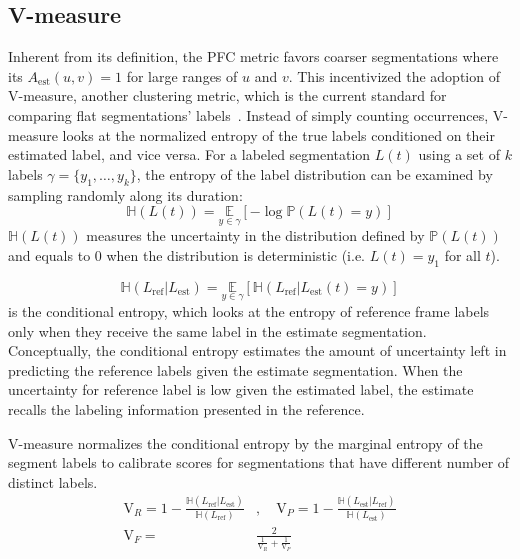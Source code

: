 \subsection{V-measure}
Inherent from its definition, the PFC metric favors coarser segmentations where its $A_\text{est}(u, v) = 1$ for large ranges of $u$ and $v$.
This incentivized the adoption of V-measure, another clustering metric, which is the current standard for comparing flat segmentations' labels~\cite{lukashevich2008towards}.
Instead of simply counting occurrences, V-measure looks at the normalized entropy of the true labels conditioned on their estimated label, and vice versa.
For a labeled segmentation $L(t)$ using a set of $k$ labels $\gamma = \{y_1, \ldots, y_k\}$, the entropy of the label distribution can be examined by sampling randomly along its duration:
$$\mathbb{H}(L(t)) = \underset{{y\in\gamma}}{\mathbb{E}}[-\log\mathbb{P}(L(t) = y)]$$
$\mathbb{H}(L(t))$ measures the uncertainty in the distribution defined by $\mathbb{P}(L(t))$ and equals to 0 when the distribution is deterministic (i.e. $L(t) = y_1$ for all $t$). 

$$\mathbb{H}(L_\text{ref} | L_\text{est}) = \underset{y\in\gamma}{\mathbb{E}}[\mathbb{H}(L_\text{ref} | L_\text{est}(t) = y)]$$
is the conditional entropy, which looks at the entropy of reference frame labels only when they receive the same label in the estimate segmentation.
Conceptually, the conditional entropy estimates the amount of uncertainty left in predicting the reference labels given the estimate segmentation.
When the uncertainty for reference label is low given the estimated label, the estimate recalls the labeling information presented in the reference.

V-measure normalizes the conditional entropy by the marginal entropy of the segment labels to calibrate scores for segmentations that have different number of distinct labels.
\begin{align*}
\text{V}_R = 1 - \frac{\mathbb{H}(L_\text{ref} | L_\text{est})}{\mathbb{H}(L_\text{ref})}&, \quad
\text{V}_P = 1 - \frac{\mathbb{H}(L_\text{est} | L_\text{ref})}{\mathbb{H}(L_\text{est})} \\
\text{V}_F = &\frac{2}{\frac1{\text{V}_R} + \frac1{\text{V}_P}}
\end{align*}
